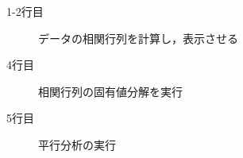 \begin{description}
	\item[1-2行目] データの相関行列を計算し，表示させる
	\item[4行目] 相関行列の固有値分解を実行
	\item[5行目] 平行分析の実行
\end{description}
